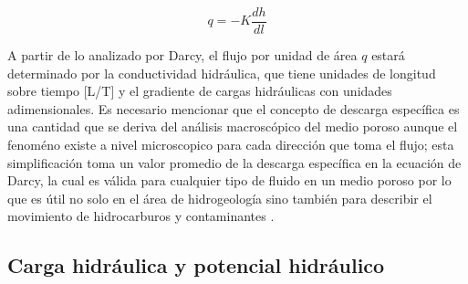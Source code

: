 \begin{equation}
\label{phi1me}
 q=-K\dfrac{dh}{dl}
\end{equation}

A partir de lo analizado por Darcy, el flujo por unidad de área $q$ estará determinado por la conductividad hidráulica, que tiene unidades de longitud sobre tiempo [L/T] y el gradiente de cargas hidráulicas con unidades adimensionales. Es necesario mencionar que el concepto de  descarga específica es una cantidad que se deriva del análisis macroscópico del medio poroso aunque el fenoméno existe a nivel microscopico para cada dirección que toma el flujo; esta simplificación toma un valor promedio de la descarga específica en la ecuación de Darcy, la cual es válida para cualquier tipo de fluido en un medio poroso por lo que es útil no solo en el área de hidrogeología sino también para describir el movimiento de hidrocarburos y contaminantes \cite{Freeze1979}\cite{Toth2009}.

\subsection{Carga hidráulica y potencial hidráulico}

